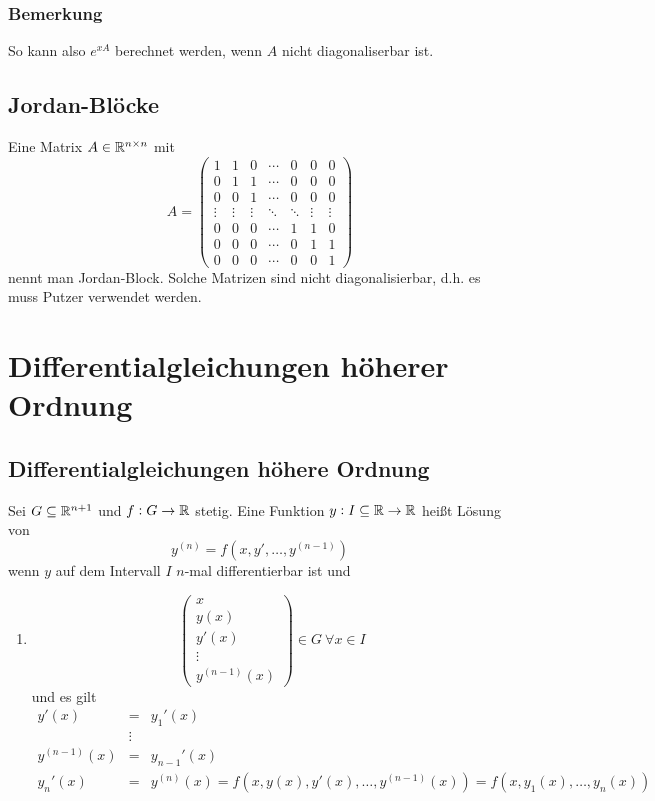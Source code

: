 \subsubsection{Bemerkung}
So kann also $e^{xA}$ berechnet werden, wenn $A$ nicht diagonaliserbar ist.

\subsection{Jordan-Blöcke}
Eine Matrix $A \in \mathbb{R}^{n \times n}$ mit
\begin{equation*}
	A = \begin{pmatrix}
		1 & 1 & 0 & \cdots & 0 & 0 & 0 \\
		0 & 1 & 1 & \cdots & 0 & 0 & 0 \\
		0 & 0 & 1 & \cdots & 0 & 0 & 0 \\
		\vdots & \vdots & \vdots & \ddots & \ddots & \vdots & \vdots \\
		0 & 0 & 0 & \cdots & 1 & 1 & 0 \\
		0 & 0 & 0 & \cdots & 0 & 1 & 1 \\
		0 & 0 & 0 & \cdots & 0 & 0 & 1
	\end{pmatrix}
\end{equation*}
nennt man Jordan-Block. Solche Matrizen sind nicht diagonalisierbar, d.h. es muss Putzer verwendet werden.

\section{Differentialgleichungen höherer Ordnung}
\subsection{Differentialgleichungen höhere Ordnung}
Sei $G \subseteq \mathbb{R}^{n+1}$ und $f: G \to \mathbb{R}$ stetig. Eine Funktion $y: I \subseteq \mathbb{R} \to \mathbb{R}$ heißt Lösung von
\begin{equation*}
	y^{(n)} = f(x, y', \ldots, y^{(n-1)})
\end{equation*}
wenn $y$ auf dem Intervall $I$ $n$-mal differentierbar ist und
\begin{enumerate}
	\item 
		\begin{equation*}
			\begin{pmatrix}
				x \\ y(x) \\ y'(x) \\ \vdots \\ y^{(n-1)}(x)
			\end{pmatrix}
			\in G\ \forall x \in I
		\end{equation*}
		und es gilt
		\begin{eqnarray*}
			y'(x) &=& y_1'(x) \\
			&\vdots& \\
			y^{(n-1)}(x) &=& y_{n-1}'(x)\\
			y_n'(x) &=& y^{(n)}(x) = f(x, y(x), y'(x), \ldots, y^{(n-1)}(x)) = f(x, y_1(x), \ldots, y_n(x))
		\end{eqnarray*}
\end{enumerate}

